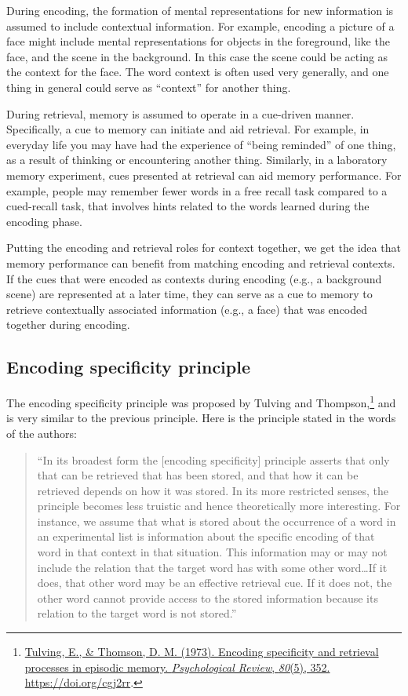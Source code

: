 \documentclass[
  oneside,
  12pt]{crumpbook}
\begin{document}
During encoding, the formation of mental representations for new information is assumed to include contextual information. For example, encoding a picture of a face might include mental representations for objects in the foreground, like the face, and the scene in the background. In this case the scene could be acting as the context for the face. The word context is often used very generally, and one thing in general could serve as ``context'' for another thing.

During retrieval, memory is assumed to operate in a cue-driven manner. Specifically, a cue to memory can initiate and aid retrieval. For example, in everyday life you may have had the experience of ``being reminded'' of one thing, as a result of thinking or encountering another thing. Similarly, in a laboratory memory experiment, cues presented at retrieval can aid memory performance. For example, people may remember fewer words in a free recall task compared to a cued-recall task, that involves hints related to the words learned during the encoding phase.

Putting the encoding and retrieval roles for context together, we get the idea that memory performance can benefit from matching encoding and retrieval contexts. If the cues that were encoded as contexts during encoding (e.g., a background scene) are represented at a later time, they can serve as a cue to memory to retrieve contextually associated information (e.g., a face) that was encoded together during encoding.

\hypertarget{encoding-specificity-principle}{%
\subsection{Encoding specificity principle}\label{encoding-specificity-principle}}

The encoding specificity principle was proposed by Tulving and Thompson,\footnote{\protect\hyperlink{ref-tulvingEncodingSpecificityRetrieval1973}{Tulving, E., \& Thomson, D. M. (1973). Encoding specificity and retrieval processes in episodic memory. \emph{Psychological Review}, \emph{80}(5), 352. \url{https://doi.org/cgj2rr}}.} and is very similar to the previous principle. Here is the principle stated in the words of the authors:

\begin{quote}
``In its broadest form the {[}encoding specificity{]} principle asserts that only that can be retrieved that has been stored, and that how it can be retrieved depends on how it was stored. In its more restricted senses, the principle becomes less truistic and hence theoretically more interesting. For instance, we assume that what is stored about the occurrence of a word in an experimental list is information about the specific encoding of that word in that context in that situation. This information may or may not include the relation that the target word has with some other word\ldots If it does, that other word may be an effective retrieval cue. If it does not, the other word cannot provide access to the stored information because its relation to the target word is not stored.''
\end{quote}
\end{document}
